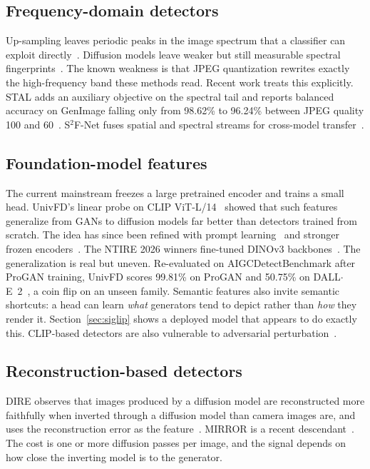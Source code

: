 \documentclass[conference]{IEEEtran}
\begin{document}
\subsection{Frequency-domain detectors}
Up-sampling leaves periodic peaks in the image spectrum that a classifier
can exploit directly~\cite{frank2020fredect}. Diffusion models leave weaker
but still measurable spectral fingerprints~\cite{corvi2023detection}. The
known weakness is that JPEG quantization rewrites exactly the
high-frequency band these methods read. Recent work treats this explicitly.
STAL adds an auxiliary objective on the spectral tail and reports balanced
accuracy on GenImage falling only from 98.62\% to 96.24\% between JPEG
quality 100 and 60~\cite{li2026stal}. S$^2$F-Net fuses spatial and spectral
streams for cross-model transfer~\cite{hu2026s2fnet}.

\subsection{Foundation-model features}
The current mainstream freezes a large pretrained encoder and trains a
small head. UnivFD's linear probe on CLIP ViT-L/14~\cite{ojha2023univfd,radford2021clip}
showed that such features generalize from GANs to diffusion models far
better than detectors trained from scratch. The idea has since been refined
with prompt learning~\cite{tan2025c2pclip,wang2026ppmclip} and stronger
frozen encoders~\cite{lee2026ssafe}. The NTIRE 2026 winners fine-tuned
DINOv3 backbones~\cite{ntire2026robust,simeoni2025dinov3}. The
generalization is real but uneven. Re-evaluated on AIGCDetectBenchmark after
ProGAN training, UnivFD scores 99.81\% on ProGAN and 50.75\% on
DALL$\cdot$E~2~\cite{yan2025aide}, a coin flip on an unseen family.
Semantic features also invite semantic shortcuts: a head can learn
\emph{what} generators tend to depict rather than \emph{how} they render it.
Section~\ref{sec:siglip} shows a deployed model that appears to do exactly
this. CLIP-based detectors are also vulnerable to adversarial
perturbation~\cite{derosa2024clipadv}.

\subsection{Reconstruction-based detectors}
DIRE observes that images produced by a diffusion model are reconstructed
more faithfully when inverted through a diffusion model than camera images
are, and uses the reconstruction error as the feature~\cite{wang2023dire}.
MIRROR is a recent descendant~\cite{liu2026mirror}. The cost is one or more
diffusion passes per image, and the signal depends on how close the
inverting model is to the generator.
\end{document}
